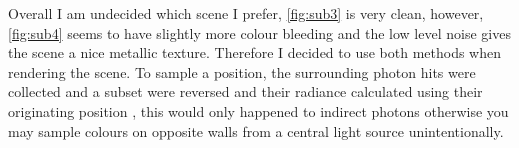 \documentclass{article}
\begin{document}
Overall I am undecided which scene I prefer, \ref{fig:sub3} is very clean, however, \ref{fig:sub4} seems to have slightly more colour bleeding and the low level noise gives the scene a nice metallic texture. Therefore I decided to use both methods when rendering the scene. To sample a position, the surrounding photon hits were collected and a subset were reversed and their radiance calculated using their originating position , this would only happened to indirect photons otherwise you may sample colours on opposite walls from a central light source unintentionally.


\newpage
\begin{appendix}
\listoffigures
\end{appendix}


\end{document}
